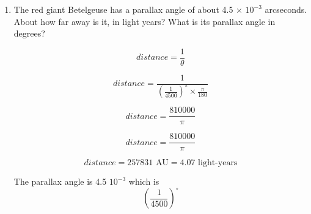 \documentclass[12pt]{article}
\begin{document}
        \begin{enumerate}
                \item The red giant Betelgeuse has a parallax angle of about 4.5 × $10^{-3}$ arcseconds. About how far away is it, in light years? What is its parallax angle in degrees?

                    \begin{equation}
                        distance = \frac{1}{\theta}
                    \end{equation}

                    \begin{equation}
                        distance = \frac{1}{\left(\frac{1}{4500}\right)^{\circ} \times \frac{\pi}{180}}
                    \end{equation}

                    
                    \begin{equation}
                        distance = \frac{810000}{\pi}
                    \end{equation}

                    \begin{equation}
                        distance = \frac{810000}{\pi}
                    \end{equation}
                    
                    \begin{equation}
                        distance = 257831 \text{ AU} = 4.07 \text{ light-years}
                    \end{equation}

                    The parallax angle is 4.5 \times $10^{-3}$ which is \newline
                    \begin{equation}
                        \left(\frac{1}{4500}\right)^{\circ}
                    \end{equation}


\end{enumerate}
\end{document}
